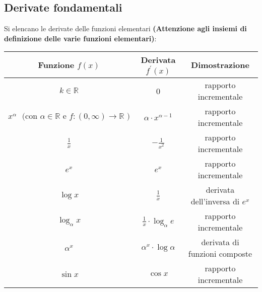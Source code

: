 \documentclass[a4paper,12pt, oneside]{book}
\begin{document}
\subsection{Derivate fondamentali}
Si elencano le derivate delle funzioni elementari \textbf{(Attenzione agli insiemi di \\ definizione delle varie funzioni elementari)}:\\
\setlength{\tabcolsep}{0.5em}
{\renewcommand{\arraystretch}{1.6}
	\begin{tabular}{|c|c|c|}
		\hline
		\textbf{Funzione} $f(x)$                                                                                       & \textbf{Derivata} $f^{'}(x)$              & \textbf{Dimostrazione}              \\
		\hline\hline
		$k\in \mathbb{R}$                                                                                              & 0                                         & rapporto incrementale               \\[1ex]
		\hline
		$x^{\alpha} \mbox{ } (\mbox{con } \alpha\in \mathbb{R} \mbox{ e } f:(0,\infty)\rightarrow \mathbb{R}\mbox{ )}$ & $\alpha\cdot x^{\alpha -1}$               & rapporto incrementale               \\[1ex]
		\hline
		$\frac{1}{x}$                                                                                                  & $-\frac{1}{x^2}$                          & rapporto incrementale               \\
		\hline
		$e^x$                                                                                                          & $e^x$                                     & rapporto incrementale               \\[1ex]
		\hline
		$\log x$                                                                                                       & $\frac{1}{x}$                             & derivata dell'inversa di $e^x$      \\[1ex]
		\hline
		$\log_\alpha x$                                                                                                & $\frac{1}{x}\cdot \log_\alpha e$          & rapporto incrementale               \\
		\hline
		$\alpha^x$                                                                                                     & $\alpha^x \cdot \log\alpha$               & derivata di funzioni composte       \\[1ex]
		\hline
		$\sin x$                                                                                                       & $\cos x$                                  & rapporto incrementale               \\[1ex]

\end{tabular}}
\end{document}
